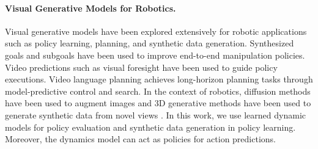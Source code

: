 \paragraph{Visual Generative Models for Robotics.}
Visual generative models have been explored extensively for robotic applications such as policy learning, planning, and synthetic data generation. Synthesized goals and subgoals \cite{du2023video,nair2018visual} have been used to improve end-to-end manipulation policies. Video predictions such as visual foresight \cite{finn2017deep} have been used to guide policy executions. Video language planning \cite{du2023video} achieves long-horizon planning tasks through model-predictive control and search. In the context of robotics, diffusion methods have been used to augment images 
 \cite{chen2023genaug,yu2023scaling} and 3D generative methods have been used to generate synthetic data from novel views \cite{zhou2023nerf}. In this work, we use learned dynamic models for policy evaluation and synthetic data generation in policy learning.  Moreover, the dynamics model can act as policies for action predictions.
